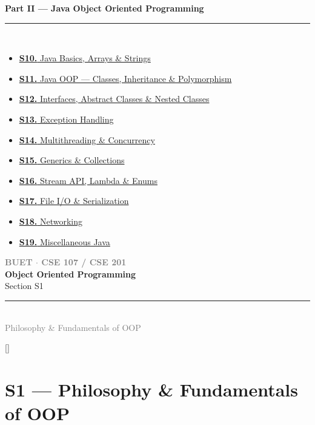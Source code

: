 \documentclass[12pt,a3paper]{article}
\newcommand{\secdivider}[4]{%
  \newpage\thispagestyle{empty}%
  \vspace*{\fill}%
  \begin{tcolorbox}[enhanced,colback=#4!7,colframe=#3,boxrule=1.5pt,arc=8pt,
    left=20pt,right=20pt,top=22pt,bottom=22pt,
    shadow={3pt}{-3pt}{0pt}{black!15}]
    \centering
    {\large\textcolor{gray}{\textbf{BUET $\cdot$ CSE 107 / CSE 201}}}\\[8pt]
    {\fontsize{26}{32}\selectfont\bfseries\textcolor{#3}{Object Oriented Programming}}\\[6pt]
    {\fontsize{15}{19}\selectfont\textcolor{dgray}{#1}}\\[12pt]
    \textcolor{#3!60}{\rule{0.5\textwidth}{0.5pt}}\\[6pt]
    {\small\textcolor{gray}{#2}}
  \end{tcolorbox}%
  \vspace*{\fill}\newpage%
}
\begin{document}
\begin{tcolorbox}[colback=cB!5,colframe=cB,boxrule=1pt,arc=5pt,
  left=8pt,right=8pt,top=8pt,bottom=8pt,before skip=4pt]
  {\large\bfseries\textcolor{cB}{Part II --- Java Object Oriented Programming}}\\[5pt]
  \textcolor{cB!40}{\rule{\textwidth}{0.4pt}}\\[3pt]
  \small\begin{itemize}[leftmargin=1.2em,itemsep=1pt,label={\textcolor{cB}{$\triangleright$}}]
    \item \hyperref[sec:S10]{\textbf{S10.} Java Basics, Arrays \& Strings}
    \item \hyperref[sec:S11]{\textbf{S11.} Java OOP --- Classes, Inheritance \& Polymorphism}
    \item \hyperref[sec:S12]{\textbf{S12.} Interfaces, Abstract Classes \& Nested Classes}
    \item \hyperref[sec:S13]{\textbf{S13.} Exception Handling}
    \item \hyperref[sec:S14]{\textbf{S14.} Multithreading \& Concurrency}
    \item \hyperref[sec:S15]{\textbf{S15.} Generics \& Collections}
    \item \hyperref[sec:S16]{\textbf{S16.} Stream API, Lambda \& Enums}
    \item \hyperref[sec:S17]{\textbf{S17.} File I/O \& Serialization}
    \item \hyperref[sec:S18]{\textbf{S18.} Networking}
    \item \hyperref[sec:S19]{\textbf{S19.} Miscellaneous Java}
  \end{itemize}
\end{tcolorbox}

\newpage

\secdivider{Section S1}{Philosophy \& Fundamentals of OOP}{cA}{cA}
\label{sec:S1}
\titleformat{\section}{\large\bfseries\color{cA}}{}{0em}{}[\titlerule]
\section{S1 --- Philosophy \& Fundamentals of OOP}
\end{document}
